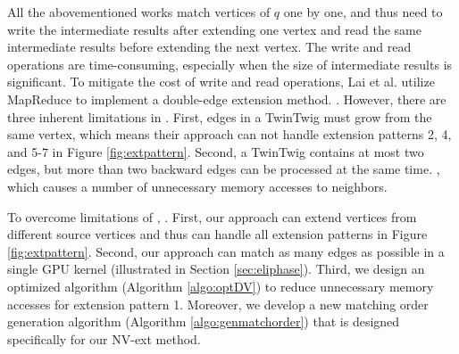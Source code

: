 All the abovementioned works match vertices of $q$ one by one, and thus need to write the intermediate results after extending one vertex and read the same intermediate results before extending the next vertex. The write and read operations are time-consuming, especially when the size of intermediate results is significant. To mitigate the cost of write and read operations, Lai et al. \cite{lai2015scalable} utilize MapReduce to implement a double-edge extension method. . However, there are three inherent limitations in \cite{lai2015scalable}. First, edges in a TwinTwig must grow from the same vertex, which means their approach can not handle extension patterns 2, 4, and 5-7 in Figure \ref{fig:extpattern}. Second, a TwinTwig contains at most two edges, but more than two backward edges can be processed at the same time. , which causes a number of unnecessary memory accesses to neighbors.

To overcome limitations of \cite{lai2015scalable}, . First, our approach can extend vertices from different source vertices and thus can handle all extension patterns in Figure \ref{fig:extpattern}. Second, our approach can match as many edges as possible in a single GPU kernel (illustrated in Section \ref{sec:eliphase}). Third, we design an optimized algorithm (Algorithm \ref{algo:optDV}) to reduce unnecessary memory accesses for extension pattern 1. Moreover, we develop a new matching order generation algorithm (Algorithm \ref{algo:genmatchorder}) that is designed specifically for our NV-ext method.


